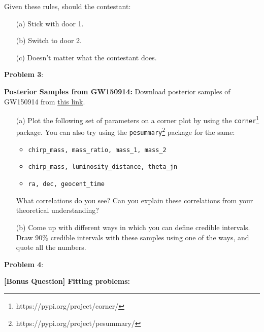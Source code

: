 \documentclass{article} %
\newcommand{\question}[2][]{\begin{flushleft}
        \textbf{Problem #1}: %
\end{flushleft}
}
\begin{document}
    Given these rules, should the contestant:
    
    \begin{enumerate}
    	\item[(a)] Stick with door 1.
    	\item[(b)] Switch to door 2.
    	\item[(c)] Doesn't matter what the contestant does.
    \end{enumerate}
    
    
    
    \question[3]{} \textbf{Posterior Samples from GW150914:}
    Download posterior samples of GW150914 from \href{https://drive.google.com/drive/folders/1L2xsQM4mfoljLTlTrF6nTbvZ1yM0l4hH?usp=sharing}{this link}.
    \begin{enumerate}
   	\item[(a)] Plot the following set of parameters on a corner plot by using the \texttt{corner}\footnote{https://pypi.org/project/corner/} package. You can also try using the \texttt{pesummary}\footnote{https://pypi.org/project/pesummary/} package for the same:
   	
   	\begin{itemize}
   		\item \texttt{chirp\_mass, mass\_ratio, mass\_1, mass\_2}
   		\item \texttt{chirp\_mass, luminosity\_distance, theta\_jn}
   		\item \texttt{ra, dec, geocent\_time}
   	\end{itemize}
   	
    What correlations do you see? Can you explain these correlations from your theoretical understanding?
    \item[(b)] Come up with different ways in which you can define credible intervals. Draw 90\% credible intervals with these samples using one of the ways, and quote all the numbers.
    \end{enumerate}
    
    \question[4]{} 
\textbf{[Bonus Question] Fitting problems:} 
\end{document}
